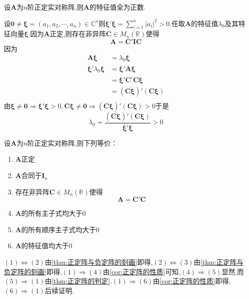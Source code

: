 \begin{green}
    \begin{corollary}[正定阵的特征值]\label{cor:正定阵的特征值}
        设$\bm{A}$为$n$阶正定实对称阵,则$\bm{A}$的特征值全为正数.
    \end{corollary}
    \begin{Proof}
       设$\bm{0}\neq\bm{\xi}=\left(a_1,a_2,\cdots,a_n\right)\in\mathbb{C}^n$则$\displaystyle \overline{\bm{\xi}}'\bm{\xi}=\sum_{i=1}^{n}\left|a_i\right|^2>0$.任取$\bm{A}$的特征值$\lambda_0$及其特征向量$\bm{\xi}$.因为$\bm{A}$正定,则存在非异阵$\bm{C}\in M_n\left(\mathbb{R}\right)$使得\[
       \bm{A}=\bm{C}'\bm{IC}
       \]因为\begin{align*}
        \bm{A\xi}&=\lambda_0\bm{\xi}\\
        \overline{\bm{\xi}}'\lambda_0\bm{\xi}&=\overline{\bm{\xi}}'\bm{A\xi}\\
        &=\overline{\bm{\xi}}'\bm{C}'\bm{C}\bm{\xi}\\
        &=\left(\overline{\bm{C\xi}}\right)' \left(\bm{C\xi}\right)\\
       \end{align*}由$\bm{\xi}\neq\bm{0}\Longrightarrow\overline{\bm{\xi}}'\bm{\xi}>0,\bm{C\xi}\neq\bm{0}\Longrightarrow\left(\overline{\bm{C\xi}}\right)' \left(\bm{C\xi}\right)>0$于是\[
       \lambda_0=\frac{
        \left(\overline{\bm{C\xi}}\right)' \left(\bm{C\xi}\right)
       }{\overline{\bm{\xi}}'\bm{\xi}}>0
       \]
    \end{Proof}
\end{green}
\begin{formal}
    \begin{proposition}[正定的若干等价结论]\label{prop:正定的若干等价结论}
        设$\bm{A}$为$n$阶正定实对称阵,则下列等价：
        \begin{enumerate}[label={\textup{(\arabic*)}}]
            \item $\bm{A}$正定
            \item $\bm{A}$合同于$\bm{I}_n$
            \item 存在非异阵$\bm{C}\in M_n\left(
                \mathbb{R}
            \right)$使得\[
            \bm{A}=\bm{C}'\bm{C}
            \]
            \item $\bm{A}$的所有主子式均大于$0$
            \item $\bm{A}$的所有顺序主子式均大于$0$
            \item $\bm{A}$的特征值均大于$0$
        \end{enumerate}
    \end{proposition}
    \begin{Proof}
        $(1)\Longleftrightarrow (2)$由\cref{thm:正定阵与负定阵的刻画}即得,$(2)\Longleftrightarrow (3)$由\cref{thm:正定阵与负定阵的刻画}即得,$(1)\Longrightarrow (4)$由\cref{cor:正定阵的性质}可知,$(4)\Longrightarrow (5)$显然,而$(5)\Longrightarrow (1)$由\cref{thm:正定阵的判定}.$(1)\Longrightarrow (6)$由\cref{cor:正定阵的性质}即得,$(6)\Longrightarrow (1)$后续证明.
    \end{Proof}
\end{formal}
